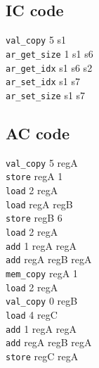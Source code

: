 \documentclass[10pt,landscape]{article}
\begin{document}
\begin{multicols}{3}
	\begin{minipage}{0.2\textwidth}
		\subsection{IC code}
		\verb!val_copy! 5 s1 \\
		\verb!ar_get_size! 1 s1 s6 \\
		\verb!ar_get_idx! s1 s6 s2 \\
		\verb!ar_set_idx! s1 s7 \\
		\verb!ar_set_size! s1 s7 \\
	\end{minipage}%
	\begin{minipage}{0.2 	\textwidth}
		\subsection{AC code}
		\verb!val_copy! 5 regA \\
		\verb!store! regA 1\\
		
		\verb!load! 2 regA\\
		\verb!load! regA regB\\
		\verb!store! regB 6\\
		
		\verb!load! 2 regA\\
		\verb!add! 1 regA regA\\
		\verb!add! regA regB regA\\
		\verb!mem_copy! regA 1\\
		
		\verb!load! 2 regA\\
		\verb!val_copy! 0 regB \\
		\verb!load! 4 regC\\
		\verb!add! 1 regA regA\\
		\verb!add! regA regB regA\\
		\verb!store! regC regA\\
		

\end{minipage}
\end{multicols}
\end{document}
